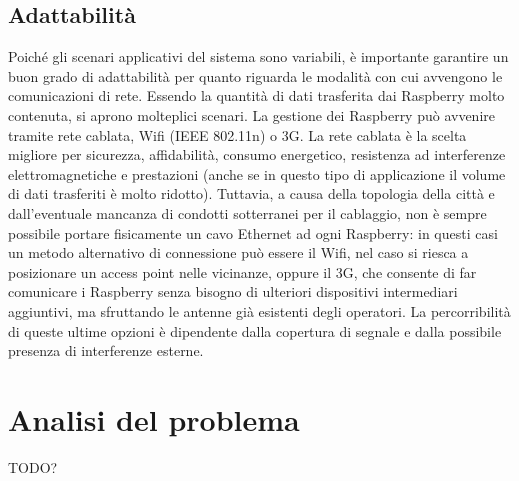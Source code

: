 \subsection{Adattabilità}
Poiché gli scenari applicativi del sistema sono variabili, è importante garantire un buon grado di adattabilità per quanto riguarda le modalità con cui avvengono le comunicazioni di rete. Essendo la quantità di dati trasferita dai Raspberry molto contenuta, si aprono molteplici scenari. La gestione dei Raspberry può avvenire tramite rete cablata, Wifi (IEEE 802.11n) o 3G. La rete cablata è la scelta migliore per sicurezza, affidabilità, consumo energetico, resistenza ad interferenze elettromagnetiche e prestazioni (anche se in questo tipo di applicazione il volume di dati trasferiti è molto ridotto). Tuttavia, a causa della topologia della città e dall’eventuale mancanza di condotti sotterranei per il cablaggio, non è sempre possibile portare fisicamente un cavo Ethernet ad ogni Raspberry: in questi casi un metodo alternativo di connessione può essere il Wifi, nel caso si riesca a posizionare un access point nelle vicinanze, oppure il 3G, che consente di far comunicare i Raspberry senza bisogno di ulteriori dispositivi intermediari aggiuntivi, ma sfruttando le antenne già esistenti degli operatori. La percorribilità di queste ultime opzioni è dipendente dalla copertura di segnale e dalla possibile presenza di interferenze esterne.

\section{Analisi del problema}
TODO?